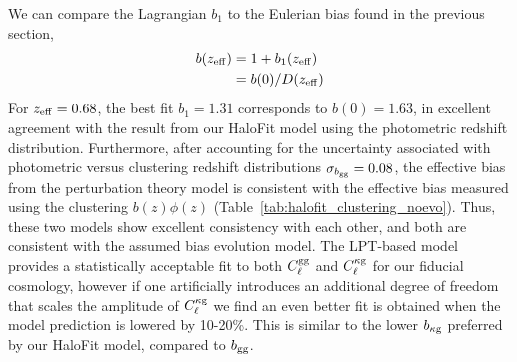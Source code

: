 We can compare the Lagrangian $b_1$ to the Eulerian bias found in the previous section,
\begin{align}
    b(z_{\rm eff}) &= 1 + b_1(z_{\rm eff}) \\
    &= b(0)/D(z_{\rm eff})
\end{align}
For $z_{\rm eff} = 0.68$, the best fit $b_1 = 1.31$ corresponds to $b(0) = 1.63$, in excellent agreement with the result from our HaloFit model using the photometric redshift distribution. Furthermore, after accounting for the uncertainty associated with photometric versus clustering redshift distributions $\sigma_{b_{\rm gg}} = 0.08$, the effective bias from the perturbation theory model is consistent with the effective bias measured using the clustering $b(z)\phi(z)$ (Table~\ref{tab:halofit_clustering_noevo}). Thus, these two models show excellent consistency with each other, and both are consistent with the assumed bias evolution model.  The LPT-based model provides a statistically acceptable fit to both $C_\ell^{\rm gg}$ and $C_\ell^{\rm \kappa g}$ for our fiducial cosmology, however if one artificially introduces an additional degree of freedom that scales the amplitude of $C_\ell^{\rm \kappa g}$ we find an even better fit is obtained when the model prediction is lowered by 10-20\%.  This is similar to the lower $b_{\rm \kappa g}$ preferred by our HaloFit model, compared to $b_{\rm gg}$.
